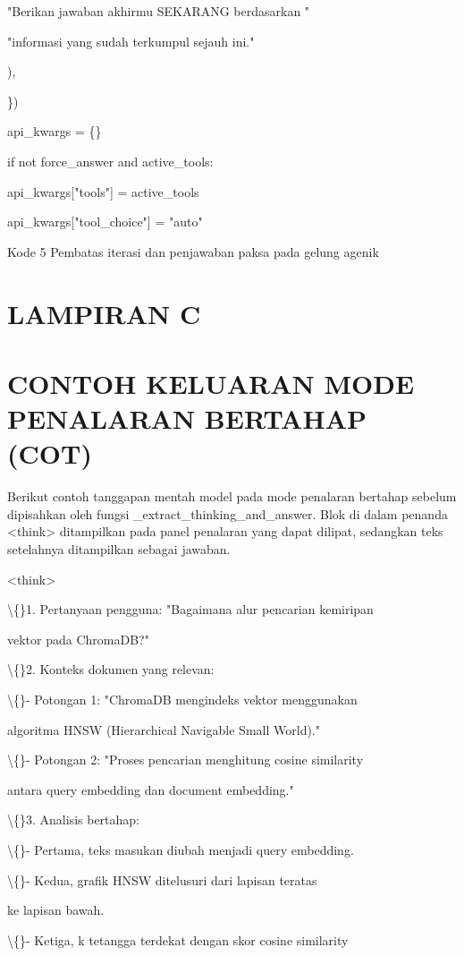 \documentclass[12pt,a4paper]{article}
\begin{document}
"Berikan jawaban akhirmu SEKARANG berdasarkan "

"informasi yang sudah terkumpul sejauh ini."

),

\})

api\_kwargs = \{\}

if not force\_answer and active\_tools:

api\_kwargs{[}"tools"{]} = active\_tools

api\_kwargs{[}"tool\_choice"{]} = "auto"

Kode 5	Pembatas iterasi dan penjawaban paksa pada gelung agenik

\section*{LAMPIRAN C}
\section*{CONTOH KELUARAN MODE PENALARAN BERTAHAP (COT)}
Berikut contoh tanggapan mentah model pada mode penalaran bertahap sebelum dipisahkan oleh fungsi \_extract\_thinking\_and\_answer. Blok di dalam penanda \textless{}think\textgreater{} ditampilkan pada panel penalaran yang dapat dilipat, sedangkan teks setelahnya ditampilkan sebagai jawaban.

\textless{}think\textgreater{}

\textbackslash\{\}1. Pertanyaan pengguna: "Bagaimana alur pencarian kemiripan

vektor pada ChromaDB?"

\textbackslash\{\}2. Konteks dokumen yang relevan:

\textbackslash\{\}- Potongan 1: "ChromaDB mengindeks vektor menggunakan

algoritma HNSW (Hierarchical Navigable Small World)."

\textbackslash\{\}- Potongan 2: "Proses pencarian menghitung cosine similarity

antara query embedding dan document embedding."

\textbackslash\{\}3. Analisis bertahap:

\textbackslash\{\}- Pertama, teks masukan diubah menjadi query embedding.

\textbackslash\{\}- Kedua, grafik HNSW ditelusuri dari lapisan teratas

ke lapisan bawah.

\textbackslash\{\}- Ketiga, k tetangga terdekat dengan skor cosine similarity
\end{document}
